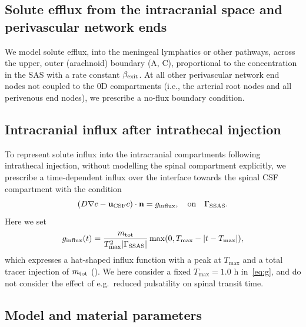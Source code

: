 \documentclass[fleqn,10pt]{wlscirep}
\begin{document}
\subsection*{Solute efflux from the intracranial space and perivascular network ends}

We model solute efflux, into the meningeal lymphatics or other
pathways, across the upper, outer (arachnoid) boundary
(A, C), proportional to the
concentration in the SAS with a rate constant $\beta_{\rm exit}$. At all other perivascular network end nodes not coupled to the 0D
compartments (i.e., the arterial root nodes and all perivenous end
nodes), we prescribe a no-flux boundary condition.

\subsection*{Intracranial influx after intrathecal injection}

To represent solute influx into the intracranial compartments
following intrathecal injection, without modelling the spinal
compartment explicitly, we prescribe a time-dependent influx 
over the interface towards the spinal CSF compartment with the condition
\begin{equation*}
  (D \nabla c - \mathbf{u}_{\rm CSF} c ) \cdot \mathbf{n} = g_{\mathrm{influx}},  \quad \mathrm{on}  \quad \Gamma_{\mathrm{SSAS}}.
\end{equation*}
Here we set
\begin{equation}
  g_\mathrm{influx}(t) = \frac{m_{\rm tot}}{T_{\rm max}^2 |\Gamma_{\rm SSAS}|} \max(0, T_{\rm max} - |t - T_{\rm max}|), 
  \label{eq:g}
\end{equation}
which expresses a hat-shaped influx function with a peak at $T_{\max}$ and a total tracer injection of $m_{\rm tot}$ (). We here consider a fixed $T_{\max} = 1.0$ h in~\eqref{eq:g}, and do not consider the effect of e.g.~reduced pulsatility on spinal transit time.

\subsection*{Model and material parameters}
\end{document}
